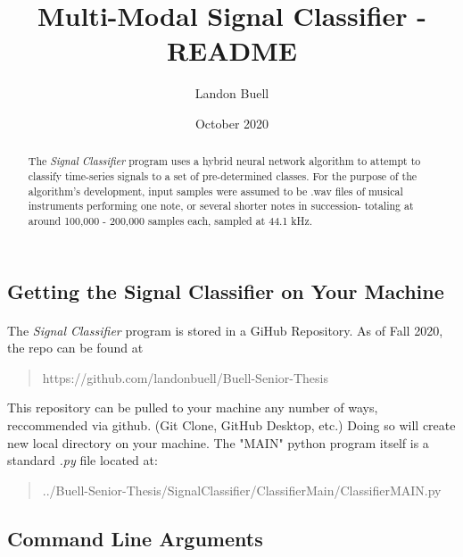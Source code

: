 \documentclass[12pt,letterpaper]{article}
\begin{document}

\title{Multi-Modal Signal Classifier - README}
\author{Landon Buell}
\date{October 2020}
\maketitle

\begin{abstract}
The \textit{Signal Classifier} program uses a hybrid neural network algorithm to attempt to classify time-series signals to a set of pre-determined classes. For the purpose of the algorithm's development, input samples were assumed to be .wav files of musical instruments performing one note, or several shorter notes in succession- totaling at around 100,000 - 200,000 samples each, sampled at 44.1 kHz.
\end{abstract}


\subsection{Getting the Signal Classifier on Your Machine}

\paragraph*{}The \textit{Signal Classifier} program is stored in a GiHub Repository. As of Fall 2020, the repo can be found at
\begin{quote}
https://github.com/landonbuell/Buell-Senior-Thesis
\end{quote}
This repository can be pulled to your machine any number of ways, reccommended via github. (Git Clone, GitHub Desktop, etc.) Doing so will create new local directory on your machine. The "MAIN" python program itself is a standard \textit{.py} file located at:
\begin{quote}
../Buell-Senior-Thesis/SignalClassifier/ClassifierMain/ClassifierMAIN.py
\end{quote}


\subsection{Command Line Arguments}
\end{document}
